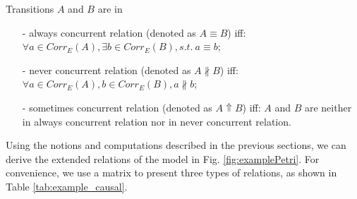 \documentclass{llncs}
\begin{document}
\begin{definition}\label{def:concurrentRelations}
Transitions $A$ and $B$ are in
	\begin{itemize}
		\item[-] always concurrent relation (denoted as $A\equiv B$) iff: $\forall a\in Corr_{E}(A),\exists b\in Corr_{E}(B),s.t.~a\equiv b$;
		\item[-] never concurrent relation (denoted as $A\nparallel B$) iff: $\forall a\in Corr_{E}(A),b\in Corr_{E}(B),a\nparallel b$;
		\item[-] sometimes concurrent relation (denoted as $A\Uparrow B$) iff: $A$ and $B$ are neither in always concurrent relation nor in never concurrent relation.
	\end{itemize}
\end{definition}

Using the notions and computations described in the previous sections, we can derive the extended relations of the model in Fig. \ref{fig:examplePetri}. For convenience, we use a matrix to present three types of relations, as shown in Table \ref{tab:example_causal}.
\end{document}
